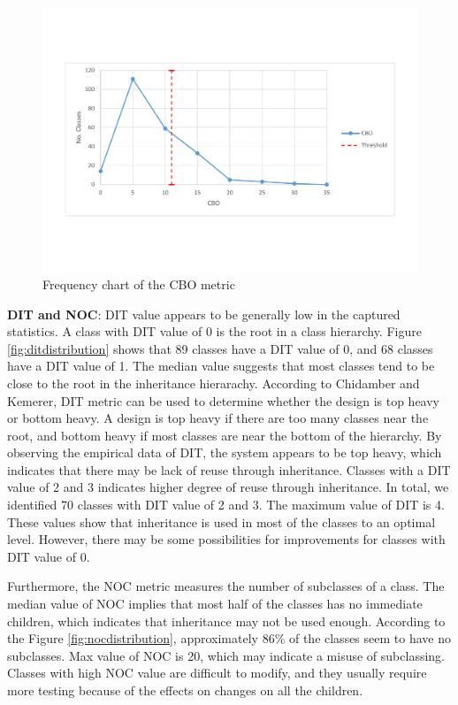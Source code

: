 \begin{figure}[ht!]
	\centering
	\includegraphics[width=\textwidth]{images/threshold/cbo.pdf}
	\caption{Frequency chart of the CBO metric}
	\label{fig:cbodistribution}
\end{figure}




\textbf{DIT and NOC}: DIT value appears to be generally low in the captured statistics. A class with DIT value of 0 is the root in a class hierarchy. Figure \ref{fig:ditdistribution} shows that 89 classes have a DIT value of 0, and 68 classes have a DIT value of 1. The median value suggests that most classes tend to be close to the root in the inheritance hierarachy. According to Chidamber and Kemerer\cite{chidamber1994metrics}, DIT metric can be used to determine whether the design is top heavy or bottom heavy. A design is top heavy if there are too many classes near the root, and bottom heavy if most classes are near the bottom of the hierarchy. By observing the empirical data of DIT, the system appears to be top heavy, which indicates that there may be lack of reuse through inheritance. Classes with a DIT value of 2 and 3 indicates higher degree of reuse through inheritance. In total, we identified 70 classes with DIT value of 2 and 3. The maximum value of DIT is 4. These values show that inheritance is used in most of the classes to an optimal level. However, there may be some possibilities for improvements for classes with DIT value of 0. 

Furthermore, the NOC metric measures the number of subclasses of a class. The median value of NOC implies that most half of the classes has no immediate children, which indicates that inheritance may not be used enough. According to the Figure \ref{fig:nocdistribution}, approximately 86\% of the classes seem to have no subclasses. Max value of NOC is 20, which may indicate a misuse of subclassing. Classes with high NOC value are difficult to modify, and they usually require more testing because of the effects on changes on all the children. 

